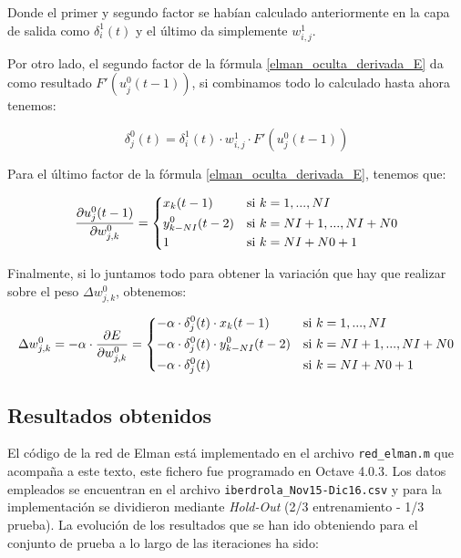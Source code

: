 \documentclass[a4paper,11pt]{article}
\begin{document}
Donde el primer y segundo factor se habían calculado anteriormente en la capa de salida como ${\delta_{i}^{1}(t)}$ y el último da simplemente ${w_{i,j}^{1}}$.

Por otro lado, el segundo factor de la fórmula \ref{elman_oculta_derivada_E} da como resultado ${F'\left(u_{j}^{0}(t-1)\right)}$, si combinamos todo lo calculado hasta ahora tenemos:

\begin{equation}
	\delta_{j}^{0}(t) = \delta_{i}^{1}(t) \cdot w_{i,j}^{1} \cdot F'\left(u_{j}^{0}(t-1)\right)
\end{equation}

Para el último factor de la fórmula \ref{elman_oculta_derivada_E}, tenemos que:

\begin{equation}
	\frac{\partial u_{j}^{0}(t-1)}{\partial w_{j,k}^{0}} =
	\begin{dcases}
		x_{k}(t-1)			& \textrm{si } k=1,...,NI\\
		y_{k-NI}^{0}(t-2)	& \textrm{si } k=NI+1,...,NI+N0\\
		1					& \textrm{si } k=NI+N0+1
	\end{dcases}
\end{equation}

Finalmente, si lo juntamos todo para obtener la variación que hay que realizar sobre el peso ${\Delta w_{j,k}^{0}}$, obtenemos:

\begin{equation}
	\Delta w_{j,k}^{0} = -\alpha \cdot \frac{\partial E}{\partial w_{j,k}^{0}} =
    \begin{dcases}
		-\alpha \cdot \delta_{j}^{0}(t) \cdot x_{k}(t-1)
        	& \textrm{si } k=1,...,NI\\
		-\alpha \cdot \delta_{j}^{0}(t) \cdot y_{k-NI}^{0}(t-2)
        	& \textrm{si } k=NI+1,...,NI+N0\\
		-\alpha \cdot \delta_{j}^{0}(t)
        	& \textrm{si } k=NI+N0+1
	\end{dcases}
\end{equation}

\subsection{Resultados obtenidos}
El código de la red de Elman está implementado en el archivo \texttt{red\_elman.m} que acompaña a este texto, este fichero fue programado en Octave 4.0.3. Los datos empleados se encuentran en el archivo \texttt{iberdrola\_Nov15-Dic16.csv} y para la implementación se dividieron mediante \textit{Hold-Out} (2/3 entrenamiento - 1/3 prueba). La evolución de los resultados que se han ido obteniendo para el conjunto de prueba a lo largo de las iteraciones ha sido:
\end{document}
